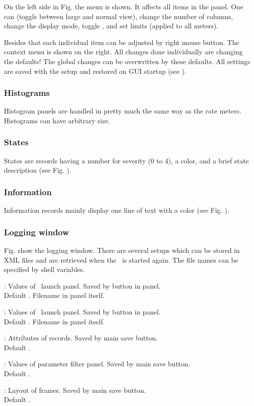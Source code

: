 {On the left side in Fig.  the 
menu is shown. It affects all items in the panel. One can 
(toggle between large and normal view), change the number of
columns, change the display mode, toggle , and set limits
(applied to all meters). 

Besides that each individual item can be
adjusted by right mouse button. The context menu is shown on the right.
All changes done individually are changing the defaults!
The global changes can be overwritten by these defaults.
All settings are saved with the setup and restored on GUI startup
(see ).
\subsubsection{Histograms}
Histogram panels are handled in pretty much the same way as the rate meters.
Histograms can have arbitrary size.
\subsubsection{States}
States are records having a number for severity (0 to 4), a color,
and a brief state description (see Fig. ).
\subsubsection{Information}
Information records mainly display one line of text with a color
(see Fig. ).
\subsubsection{Logging window}
Fig.  show the logging window.
There are several setups which can be stored in XML files and are retrieved
when the \gui\ is started again. The file names can be specified by
shell variables. 
\bdes
\item [\keyw{DABC\_LAUNCH\_DABC}]: 
Values of \dabc\ launch panel. Saved by button in panel. \\
Default . Filename in panel itself.
\item [\keyw{DABC\_LAUNCH\_MBS}]: 
Values of \mbs\ launch panel. Saved by button in panel. \\
Default . Filename in panel itself.
\item [\keyw{DABC\_RECORD\_ATTRIBUTES}]: 
Attributes of records. Saved by main save button. \\
Default .
\item [\keyw{DABC\_PARAMETER\_FILTER}]: 
Values of parameter filter panel. Saved by main save button. \\
Default .
\item [\keyw{DABC\_GUI\_LAYOUT}]: 
Layout of frames. Saved by main save button. \\
Default .
\edes
}
